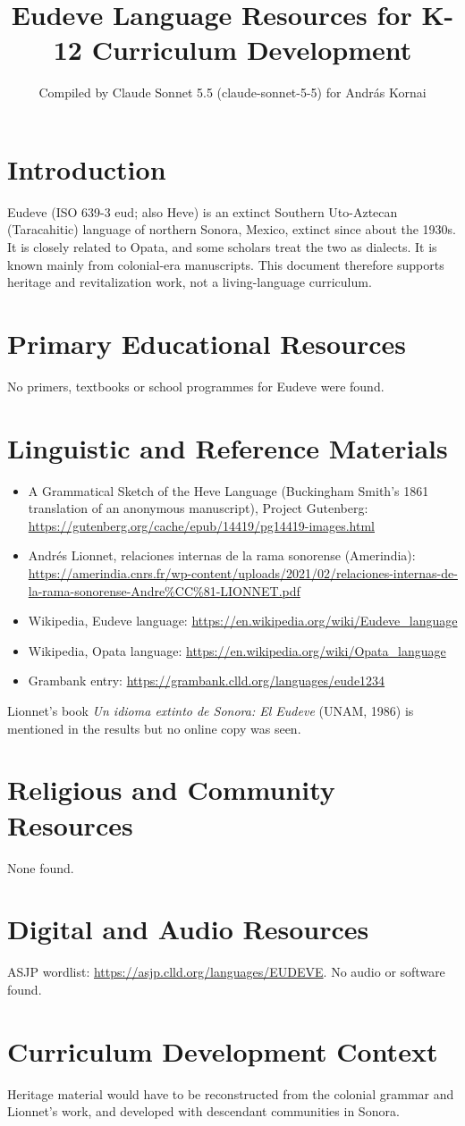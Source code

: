 \documentclass[12pt]{article}
\title{Eudeve Language Resources for K-12 Curriculum Development}
\author{Compiled by Claude Sonnet 5.5 (claude-sonnet-5-5) for Andr\'as Kornai}
\date{}
\begin{document}
\maketitle

\section{Introduction}
Eudeve (ISO 639-3 eud; also Heve) is an extinct Southern Uto-Aztecan (Taracahitic) language of northern Sonora, Mexico, extinct since about the 1930s. It is closely related to Opata, and some scholars treat the two as dialects. It is known mainly from colonial-era manuscripts. This document therefore supports heritage and revitalization work, not a living-language curriculum.

\section{Primary Educational Resources}
No primers, textbooks or school programmes for Eudeve were found.

\section{Linguistic and Reference Materials}
\begin{itemize}
\item A Grammatical Sketch of the Heve Language (Buckingham Smith's 1861 translation of an anonymous manuscript), Project Gutenberg: \url{https://gutenberg.org/cache/epub/14419/pg14419-images.html}
\item Andr\'es Lionnet, relaciones internas de la rama sonorense (Amerindia): \url{https://amerindia.cnrs.fr/wp-content/uploads/2021/02/relaciones-internas-de-la-rama-sonorense-Andre%CC%81-LIONNET.pdf}
\item Wikipedia, Eudeve language: \url{https://en.wikipedia.org/wiki/Eudeve_language}
\item Wikipedia, Opata language: \url{https://en.wikipedia.org/wiki/Opata_language}
\item Grambank entry: \url{https://grambank.clld.org/languages/eude1234}
\end{itemize}
Lionnet's book \emph{Un idioma extinto de Sonora: El Eudeve} (UNAM, 1986) is mentioned in the results but no online copy was seen.

\section{Religious and Community Resources}
None found.

\section{Digital and Audio Resources}
ASJP wordlist: \url{https://asjp.clld.org/languages/EUDEVE}. No audio or software found.

\section{Curriculum Development Context}
Heritage material would have to be reconstructed from the colonial grammar and Lionnet's work, and developed with descendant communities in Sonora.
\end{document}

